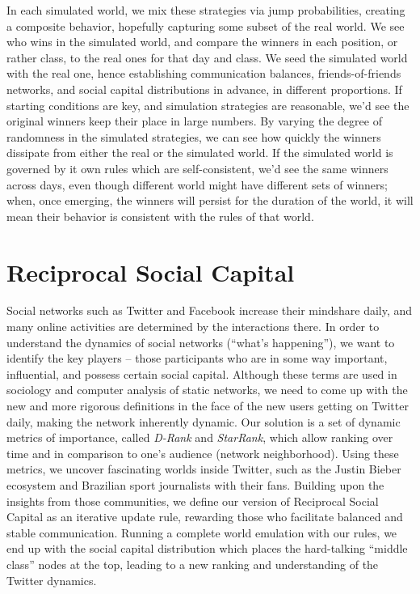 \documentclass[10pt,oneside]{memoir}
\begin{document}
In each simulated world, we mix these strategies via jump probabilities, creating a composite behavior, hopefully capturing some subset of the real world.  We see who wins in the simulated world, and compare the winners in each position, or rather class, to the real ones for that day and class.  We seed the simulated world with the real one, hence establishing communication balances, friends-of-friends networks, and social capital distributions in advance, in different proportions.  If starting conditions are key, and simulation strategies are reasonable, we'd see the original winners keep their place in large numbers.  By varying the degree of randomness in the simulated strategies, we can see how quickly the winners dissipate from either the real or the simulated world.  If the simulated world is governed by it own rules which are self-consistent, we'd see the same winners across days, even though different world might have different sets of winners; when, once emerging, the winners will persist for the duration of the world, it will mean their behavior is consistent with the rules of that world.


\pagebreak \section{Reciprocal Social Capital}
\label{reciprocalsocialcapital}

\label{chapter:SocialCapital}


Social networks such as Twitter and Facebook increase their mindshare daily, and many online activities are determined by the interactions there. In order to understand the dynamics of social networks (``what's happening''), we want to identify the key players -- those participants who are in some way important, influential, and possess certain social capital. Although these terms are used in sociology and computer analysis of static networks, we need to come up with the new and more rigorous definitions in the face of the new users getting on Twitter daily, making the network inherently dynamic. Our solution is a set of dynamic metrics of importance, called {\itshape D-Rank} and {\itshape StarRank}, which allow ranking over time and in comparison to one's audience (network neighborhood). Using these metrics, we uncover fascinating worlds inside Twitter, such as the Justin Bieber ecosystem and Brazilian sport journalists with their fans. Building upon the insights from those communities, we define our version of Reciprocal Social Capital as an iterative update rule, rewarding those who facilitate balanced and stable communication. Running a complete world emulation with our rules, we end up with the social capital distribution which places the hard-talking ``middle class'' nodes at the top, leading to a new ranking and understanding of the Twitter dynamics.
\end{document}
